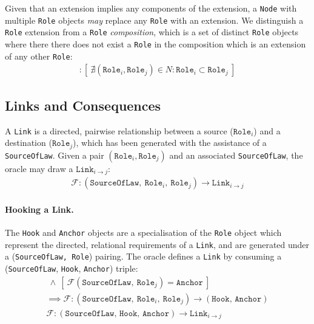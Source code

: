 \documentclass{article}
\numberwithin{equation}{section}
\begin{document}
Given that an extension implies any components of the extension, a \texttt{Node} with multiple \texttt{Role} objects \textit{may} replace any \texttt{Role} with an extension. We distinguish a \texttt{Role} extension from a \texttt{Role} \textit{composition}, which is a set of distinct \texttt{Role} objects where there there does not exist a \texttt{Role} in the composition which is an extension of any other \texttt{Role}:
\begin{align}
	[ \ N := \ \{ \ \texttt{Role}_0, .., \texttt{Role}_n \ \} \ ] : [ \ \nexists (\texttt{Role}_i, \texttt{Role}_j) \in N : \texttt{Role}_i \subset \texttt{Role}_j \ ]
\end{align}



\subsection{Links and Consequences}\label{section:links-and-consequences}

A \texttt{Link} is a directed, pairwise relationship between a source ($\texttt{Role}_i$) and a destination ($\texttt{Role}_j$), which has been generated with the assistance of a \texttt{SourceOfLaw}. Given a pair $(\texttt{Role}_i, \texttt{Role}_j)$ and an associated \texttt{SourceOfLaw}, the oracle may draw a $\texttt{Link}_{i \rightarrow j}$:
\begin{align}
	\mathcal{F} : (\texttt{SourceOfLaw}, \ \texttt{Role}_i, \ \texttt{Role}_j) \rightarrow  \texttt{Link}_{i \rightarrow j}
\end{align}

\paragraph{Hooking a Link.} The \texttt{Hook} and \texttt{Anchor} objects are a specialisation of the \texttt{Role} object which represent the directed, relational requirements of a \texttt{Link}, and are generated under a (\texttt{SourceOfLaw, Role}) pairing. The oracle defines a \texttt{Link} by consuming a (\texttt{SourceOfLaw}, \texttt{Hook}, \texttt{Anchor}) triple:
\begin{align}
	[ \ \mathcal{F}(\texttt{SourceOfLaw}, \ \texttt{Role}_i) = \texttt{Hook} \ ] \ \land \ [ \ \mathcal{F}(\texttt{SourceOfLaw}, \ \texttt{Role}_j) = \texttt{Anchor} \ ] \\
	\implies \mathcal{F}: (\texttt{SourceOfLaw}, \ \texttt{Role}_i, \ \texttt{Role}_j) \rightarrow (\texttt{Hook, Anchor}) \\ 
	\mathcal{F} : (\texttt{SourceOfLaw, Hook, Anchor}) \rightarrow \texttt{Link}_{i \rightarrow j}
\end{align}
\end{document}
